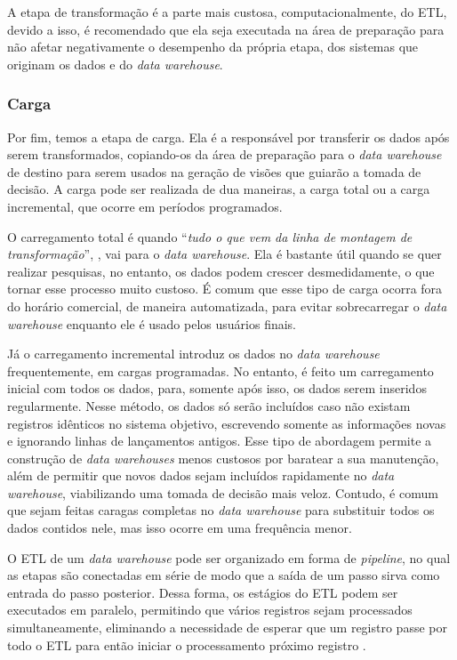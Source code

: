 A etapa de transformação é a parte mais custosa, computacionalmente, do ETL, devido a isso, é recomendado que ela seja executada na área de preparação para não afetar negativamente o desempenho da própria etapa, dos sistemas que originam os dados e do \textit{data warehouse}.

\subsubsection{Carga}
\label{subsec:carga}
Por fim, temos a etapa de carga. Ela é a responsável por transferir os dados após serem transformados, copiando-os da área de preparação para o \textit{data warehouse} de destino para serem usados na geração de visões que guiarão a tomada de decisão. A carga pode ser realizada de dua maneiras, a carga total ou a carga incremental, que ocorre em períodos programados.

O carregamento total é quando \enquote{\textit{tudo o que vem da linha de montagem de transformação}}, \cite{vida2021datawarehouse}, vai para o \textit{data warehouse}. Ela é bastante útil quando se quer realizar pesquisas, no entanto, os dados podem crescer desmedidamente, o que tornar esse processo muito custoso. É comum que esse tipo de carga ocorra fora do horário comercial, de maneira automatizada, para evitar sobrecarregar o \textit{data warehouse} enquanto ele é usado pelos usuários finais.

Já o carregamento incremental introduz os dados no \textit{data warehouse} frequentemente, em cargas programadas. No entanto, é feito um carregamento inicial com todos os dados, para, somente após isso, os dados serem inseridos regularmente. Nesse método, os dados só serão incluídos caso não existam registros idênticos no sistema objetivo, escrevendo somente as informações novas e ignorando linhas de lançamentos antigos. Esse tipo de abordagem permite a construção de \textit{data warehouses} menos custosos por baratear a sua manutenção, além de permitir que novos dados sejam incluídos rapidamente no \textit{data warehouse}, viabilizando uma tomada de decisão mais veloz. Contudo, é comum que sejam feitas caragas completas no \textit{data warehouse} para substituir todos os dados contidos nele, mas isso ocorre em uma frequência menor.

O ETL de um \textit{data warehouse} pode ser organizado em forma de \textit{pipeline}, no qual as etapas são conectadas em série de modo que a saída de um passo sirva como entrada do passo posterior. Dessa forma, os estágios do ETL podem ser executados em paralelo, permitindo que vários registros sejam processados simultaneamente, eliminando a necessidade de esperar que um registro passe por todo o ETL para então iniciar o processamento próximo registro \cite{vida2021datawarehouse}.


